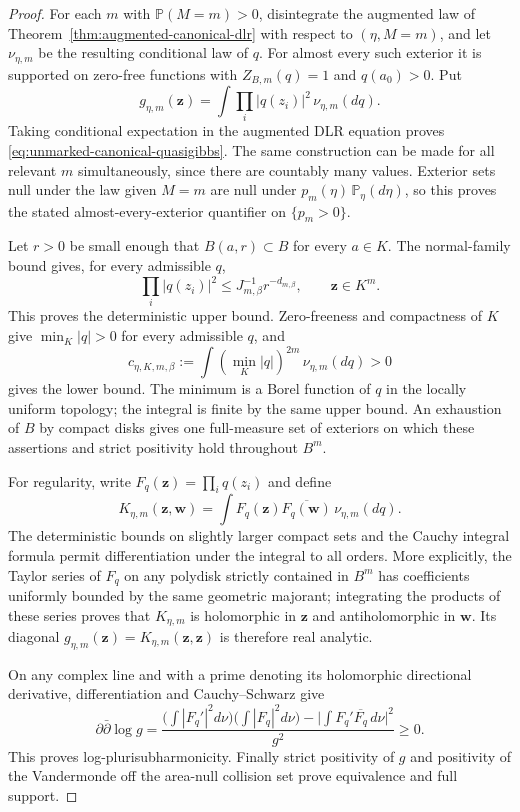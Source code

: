 \documentclass[11pt,a4paper]{article}
\numberwithin{equation}{section}
\theoremstyle{definition}
\theoremstyle{remark}
\begin{document}
\begin{proof}
For each $m$ with $\mathbb P(M=m)>0$, disintegrate the augmented law
of Theorem~\ref{thm:augmented-canonical-dlr} with respect to
$(\eta,M=m)$, and let $\nu_{\eta,m}$ be the resulting conditional law
of $q$. For almost every such exterior it is supported on zero-free
functions with $Z_{B,m}(q)=1$ and $q(a_0)>0$. Put
\begin{equation}\label{eq:quasigibbs-mixture-factor}
 g_{\eta,m}(\mathbf z)=
      \int\prod_i|q(z_i)|^2\,\nu_{\eta,m}(dq).
\end{equation}
Taking conditional expectation in the augmented DLR equation proves
\eqref{eq:unmarked-canonical-quasigibbs}. The same construction can be
made for all relevant $m$ simultaneously, since there are countably
many values. Exterior sets null under the law given $M=m$ are null
under $p_m(\eta)\,\mathbb P_\eta(d\eta)$, so this proves the stated
almost-every-exterior quantifier on $\{p_m>0\}$.

Let $r>0$ be small enough that $B(a,r)\subset B$ for every $a\in K$.
The normal-family bound gives, for every admissible $q$,
\[
 \prod_i|q(z_i)|^2\le J_{m,\beta}^{-1}r^{-d_{m,\beta}},
       \qquad\mathbf z\in K^m.
\]
This proves the deterministic upper bound. Zero-freeness and
compactness of $K$ give $\min_K|q|>0$ for every admissible $q$, and
\[
 c_{\eta,K,m,\beta}:=
      \int (\min_K|q|)^{2m}\,\nu_{\eta,m}(dq)>0
\]
gives the lower bound. The minimum is a Borel function of $q$ in the
locally uniform topology; the integral is finite by the same upper
bound. An exhaustion of $B$ by compact disks gives one full-measure
set of exteriors on which these assertions and strict positivity hold
throughout $B^m$.

For regularity, write $F_q(\mathbf z)=\prod_i q(z_i)$ and define
\[
 K_{\eta,m}(\mathbf z,\mathbf w)
       =\int F_q(\mathbf z)\overline{F_q(\mathbf w)}
                                         \,\nu_{\eta,m}(dq).
\]
The deterministic bounds on slightly larger compact sets and the
Cauchy integral formula permit differentiation under the integral to
all orders. More explicitly, the Taylor series of $F_q$ on any
polydisk strictly contained in $B^m$ has coefficients uniformly
bounded by the same geometric majorant; integrating the products of
these series proves that $K_{\eta,m}$ is holomorphic in $\mathbf z$
and antiholomorphic in $\mathbf w$. Its diagonal
$g_{\eta,m}(\mathbf z)=K_{\eta,m}(\mathbf z,\mathbf z)$ is therefore
real analytic.

On any complex line and with a prime denoting its holomorphic
directional derivative, differentiation and Cauchy--Schwarz give
\[
 \partial\bar\partial\log g
   =\frac{\bigl(\int|F_q'|^2d\nu\bigr)
                  \bigl(\int|F_q|^2d\nu\bigr)
            -\bigl|\int F_q'\overline{F_q}\,d\nu\bigr|^2}{g^2}
     \ge0.
\]
This proves log-plurisubharmonicity. Finally strict positivity of $g$
and positivity of the Vandermonde off the area-null collision set
prove equivalence and full support.
\end{proof}
\end{document}
